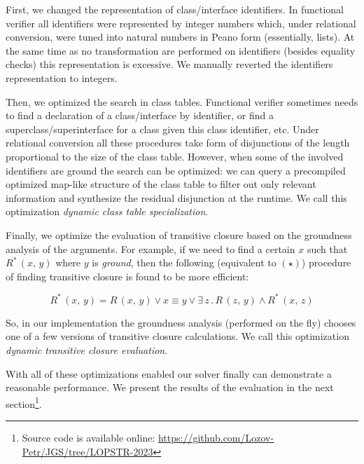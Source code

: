 First, we changed the representation of class/interface identifiers. In functional verifier all identifiers were represented by integer numbers which,
under relational conversion, were tuned into natural numbers in Peano form (essentially, lists). At the same time as no transformation are
performed on identifiers (besides equality checks) this representation is excessive. We manually reverted the identifiers representation to
integers.

Then, we optimized the search in class tables. Functional verifier sometimes needs to find a declaration of a class/interface by identifier, or
find a superclass/superinterface for a class given this class identifier, etc. Under relational conversion all these procedures
take form of disjunctions of the length proportional to the size of the class table. However, when some of the involved identifiers
are ground the search can be optimized: we can query a precompiled optimized map-like structure of the class table to filter out
only relevant information and synthesize the residual disjunction at the runtime. We call this optimization \emph{dynamic class table specialization}.

Finally, we optimize the evaluation of transitive closure based on the groundness analysis of the arguments. For example, if we need to find a certain
$x$ such that $R^*\,(x,\,y)$ where $y$ is \emph{ground}, then the following (equivalent to $(\star)$) procedure of finding transitive closure is
found to be more efficient:

\[
R^*\,(x,\, y) = R\, (x,\, y)\vee x\equiv y\vee\exists\, z\,.\,R\,(z,\,y)\wedge R^*\,(x,\,z)
\]

So, in our implementation the groundness analysis (performed on the fly) chooses one of a few versions of transitive closure calculations.
We call this optimization \emph{dynamic transitive closure evaluation}.

With all of these optimizations enabled our solver finally can demonstrate a reasonable performance. We present the results of the evaluation
in the next section\footnote{Source code is available online: \url{https://github.com/Lozov-Petr/JGS/tree/LOPSTR-2023}}. 
